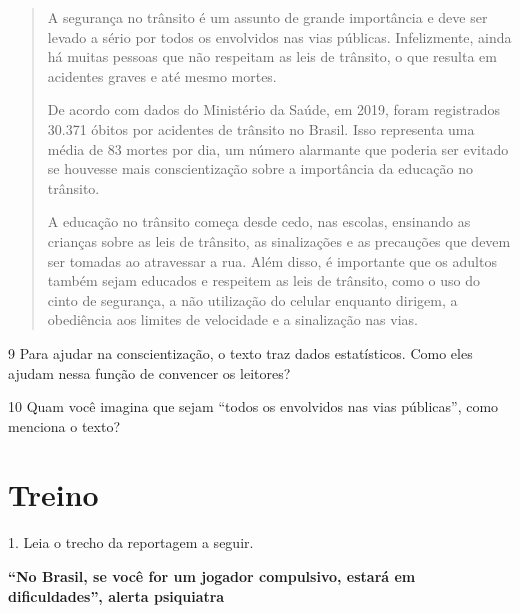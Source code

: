 \begin{quote}
A segurança no trânsito é um assunto de grande importância e deve ser
levado a sério por todos os envolvidos nas vias públicas. Infelizmente,
ainda há muitas pessoas que não respeitam as leis de trânsito, o que
resulta em acidentes graves e até mesmo mortes.


De acordo com dados do Ministério da Saúde, em 2019, foram registrados
30.371 óbitos por acidentes de trânsito no Brasil. Isso representa uma
média de 83 mortes por dia, um número alarmante que poderia ser evitado
se houvesse mais conscientização sobre a importância da educação no
trânsito.


A educação no trânsito começa desde cedo, nas escolas, ensinando as
crianças sobre as leis de trânsito, as sinalizações e as precauções que
devem ser tomadas ao atravessar a rua. Além disso, é importante que os
adultos também sejam educados e respeitem as leis de trânsito, como o
uso do cinto de segurança, a não utilização do celular enquanto dirigem,
a obediência aos limites de velocidade e a sinalização nas vias.

\end{quote}


\num{9} Para ajudar na conscientização, o texto traz dados estatísticos. Como
eles ajudam nessa função de convencer os leitores?



\num{10} Quam você imagina que sejam ``todos os envolvidos nas vias
públicas'', como menciona o texto?


\section{Treino}

1. Leia o trecho da reportagem a seguir.

\textbf{``No Brasil, se você for um jogador compulsivo, estará em
dificuldades'', alerta psiquiatra}

